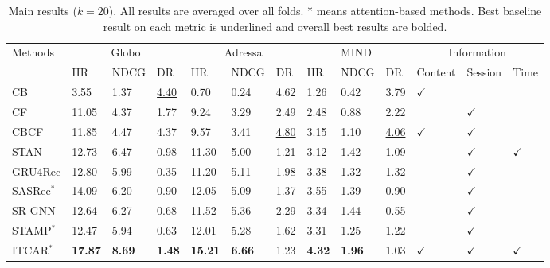 \begin{table}[th]\setlength{\tabcolsep}{2pt}
\caption{Main results ($k=20$). All results are averaged over all folds. 
* means attention-based methods. Best baseline result on each metric is underlined and 
overall best results are bolded.}
  \label{performance-table}
  \begin{threeparttable}
  \centering
  \begin{tabular}{p{1.4cm}<{\centering}|p{1.2cm}<{\centering}|p{1.2cm}<{\centering}|p{1.2cm}<{\centering}|p{1.2cm}<{\centering}|p{1.2cm}<{\centering}|p{1.2cm}<{\centering}|p{1.2cm}<{\centering}|p{1.2cm}<{\centering}|p{1.2cm}<{\centering}|p{1.2cm}<{\centering}|p{1.2cm}<{\centering}|p{1.2cm}<{\centering}}
  \toprule
  \multirow{2}{*}{Methods} & \multicolumn{3}{c|}{Globo} & \multicolumn{3}{c|}{Adressa} & \multicolumn{3}{c|}{MIND} & \multicolumn{3}{c}{Information} \\ 
  \cline{2-13} 
  & HR & NDCG & DR & HR & NDCG & DR & HR & NDCG & DR & Content & Session & Time \\ 
  \midrule
  CB    &3.55&1.37&\uline{4.40}&0.70&0.24&4.62&1.26&0.42&3.79&$\checkmark$&     &   \\
  CF    &11.05&4.37&1.77&9.24&3.29&2.49&2.48&0.88&2.22&     &$\checkmark$&   \\
  CBCF  &11.85&4.47&4.37&9.57&3.41&\uline{4.80}&3.15&1.10&\uline{4.06}&$\checkmark$&$\checkmark$&   \\
  STAN  &12.73&\uline{6.47}&0.98&11.30&5.00&1.21&3.12&1.42&1.09&     &$\checkmark$&$\checkmark$\\ 
  \midrule
  GRU4Rec&12.80&5.99&0.35&11.20&5.11&1.98&3.38&1.32&1.32&     &$\checkmark$&   \\
  SASRec$^*$ &\uline{14.09}&6.20&0.90&\uline{12.05}&5.09&1.37&\uline{3.55}&1.39&0.90&     &$\checkmark$&   \\
  SR-GNN &12.64&6.27&0.68&11.52&\uline{5.36}&2.29&3.34&\uline{1.44}&0.55&     &$\checkmark$&   \\
  STAMP$^*$ &12.47&5.94&0.63&12.01&5.28&1.62&3.31&1.25&1.22&     &$\checkmark$&   \\
  \midrule
  ITCAR$^*$ &\textbf{17.87}&\textbf{8.69}&\textbf{1.48}&\textbf{15.21}&\textbf{6.66}& 1.23 &\textbf{4.32}&\textbf{1.96} & 1.03&$\checkmark$&$\checkmark$&$\checkmark$\\ 
  \bottomrule
\end{tabular}
\end{threeparttable}
\end{table}

